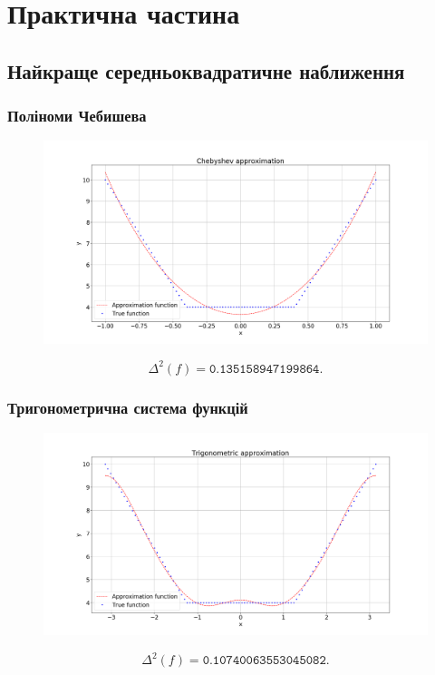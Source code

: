 
\section{Практична частина}

\subsection{Найкраще середньоквадратичне наближення}


\subsubsection{Поліноми Чебишева}
\begin{figure}[H]
    \centering
    \includegraphics[width=\textwidth]{3.png}
\end{figure}
\[ \Delta^2(f) = \texttt{0.135158947199864}. \]

\subsubsection{Тригонометрична система функцій}
\begin{figure}[H]
    \centering
    \includegraphics[width=\textwidth]{2.png}
\end{figure}
\[ \Delta^2(f) = \texttt{0.10740063553045082}. \]


